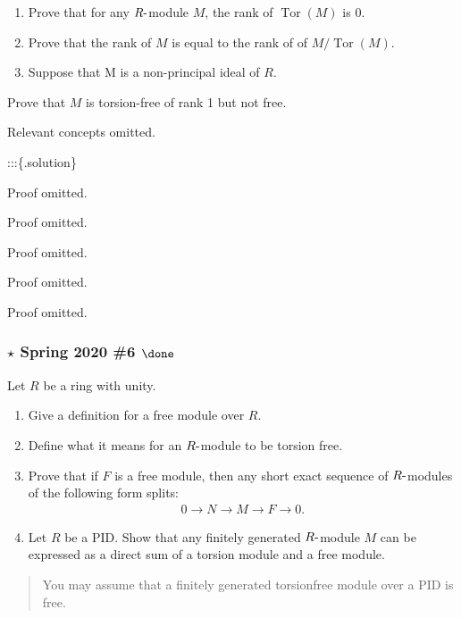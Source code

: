 \begin{enumerate}
\def\labelenumi{\alph{enumi}.}
\item
  Prove that for any \(R{\hbox{-}}\)module \(M\), the rank of
  \(\operatorname{Tor}(M )\) is 0.
\item
  Prove that the rank of \(M\) is equal to the rank of of
  \(M/\operatorname{Tor}(M )\).
\item
  Suppose that M is a non-principal ideal of \(R\).
\end{enumerate}

Prove that \(M\) is torsion-free of rank 1 but not free.

Relevant concepts omitted.

:::\{.solution\} \envlist

Proof omitted.

Proof omitted.

Proof omitted.

Proof omitted.

Proof omitted.

\hypertarget{star-spring-2020-6-done}{%
\subsubsection{\texorpdfstring{\(\star\) Spring 2020 \#6
\(\done\)}{\textbackslash star Spring 2020 \#6 \textbackslash done}}\label{star-spring-2020-6-done}}

Let \(R\) be a ring with unity.

\begin{enumerate}
\def\labelenumi{\alph{enumi}.}
\item
  Give a definition for a free module over \(R\).
\item
  Define what it means for an \(R{\hbox{-}}\)module to be torsion free.
\item
  Prove that if \(F\) is a free module, then any short exact sequence of
  \(R{\hbox{-}}\)modules of the following form splits:
  \begin{align*}
  0 \to N \to M \to F \to 0
  .\end{align*}
\item
  Let \(R\) be a PID. Show that any finitely generated
  \(R{\hbox{-}}\)module \(M\) can be expressed as a direct sum of a
  torsion module and a free module.
\end{enumerate}

\begin{quote}
You may assume that a finitely generated torsionfree module over a PID
is free.
\end{quote}

